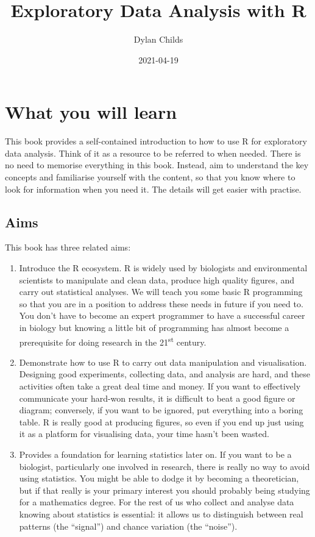 \documentclass[
]{book}
\title{Exploratory Data Analysis with R}
\author{Dylan Childs}
\date{2021-04-19}
\begin{document}
\maketitle

{
\setcounter{tocdepth}{1}
\tableofcontents
}
\hypertarget{what-you-will-learn}{%
\chapter*{What you will learn}\label{what-you-will-learn}}

This book provides a self-contained introduction to how to use R for exploratory data analysis. Think of it as a resource to be referred to when needed. There is no need to memorise everything in this book. Instead, aim to understand the key concepts and familiarise yourself with the content, so that you know where to look for information when you need it. The details will get easier with practise.

\hypertarget{aims}{%
\section*{Aims}\label{aims}}

This book has three related aims:

\begin{enumerate}
\def\labelenumi{\arabic{enumi}.}
\item
  Introduce the R ecosystem. R is widely used by biologists and environmental scientists to manipulate and clean data, produce high quality figures, and carry out statistical analyses. We will teach you some basic R programming so that you are in a position to address these needs in future if you need to. You don't have to become an expert programmer to have a successful career in biology but knowing a little bit of programming has almost become a prerequisite for doing research in the 21\textsuperscript{st} century.
\item
  Demonstrate how to use R to carry out data manipulation and visualisation. Designing good experiments, collecting data, and analysis are hard, and these activities often take a great deal time and money. If you want to effectively communicate your hard-won results, it is difficult to beat a good figure or diagram; conversely, if you want to be ignored, put everything into a boring table. R is really good at producing figures, so even if you end up just using it as a platform for visualising data, your time hasn't been wasted.
\item
  Provides a foundation for learning statistics later on. If you want to be a biologist, particularly one involved in research, there is really no way to avoid using statistics. You might be able to dodge it by becoming a theoretician, but if that really is your primary interest you should probably being studying for a mathematics degree. For the rest of us who collect and analyse data knowing about statistics is essential: it allows us to distinguish between real patterns (the ``signal'') and chance variation (the ``noise'').
\end{enumerate}
\end{document}
